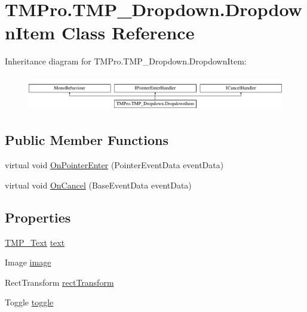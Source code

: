 \hypertarget{class_t_m_pro_1_1_t_m_p___dropdown_1_1_dropdown_item}{}\section{T\+M\+Pro.\+T\+M\+P\+\_\+\+Dropdown.\+Dropdown\+Item Class Reference}
\label{class_t_m_pro_1_1_t_m_p___dropdown_1_1_dropdown_item}
Inheritance diagram for T\+M\+Pro.\+T\+M\+P\+\_\+\+Dropdown.\+Dropdown\+Item\+:\begin{figure}[H]
\begin{center}
\leavevmode
\includegraphics[height=1.575246cm]{class_t_m_pro_1_1_t_m_p___dropdown_1_1_dropdown_item}
\end{center}
\end{figure}
\subsection*{Public Member Functions}
\begin{DoxyCompactItemize}
\item 
virtual void \mbox{\hyperlink{class_t_m_pro_1_1_t_m_p___dropdown_1_1_dropdown_item_a929b6985b92f36c6db84938cfd94e6cf}{On\+Pointer\+Enter}} (Pointer\+Event\+Data event\+Data)
\item 
virtual void \mbox{\hyperlink{class_t_m_pro_1_1_t_m_p___dropdown_1_1_dropdown_item_ac6e4a3fd548e49599be41450f77de0b5}{On\+Cancel}} (Base\+Event\+Data event\+Data)
\end{DoxyCompactItemize}
\subsection*{Properties}
\begin{DoxyCompactItemize}
\item 
\mbox{\hyperlink{class_t_m_pro_1_1_t_m_p___text}{T\+M\+P\+\_\+\+Text}} \mbox{\hyperlink{class_t_m_pro_1_1_t_m_p___dropdown_1_1_dropdown_item_a8761c93325ef49be769c649c99acb896}{text}}
\item 
Image \mbox{\hyperlink{class_t_m_pro_1_1_t_m_p___dropdown_1_1_dropdown_item_ac7ddc145533c344193daf061fdbdead7}{image}}
\item 
Rect\+Transform \mbox{\hyperlink{class_t_m_pro_1_1_t_m_p___dropdown_1_1_dropdown_item_a08a93fc16acb0997272c9e59d4dbc866}{rect\+Transform}}
\item 
Toggle \mbox{\hyperlink{class_t_m_pro_1_1_t_m_p___dropdown_1_1_dropdown_item_aca93e992665dcb739782e24b79b3d935}{toggle}}
\end{DoxyCompactItemize}


